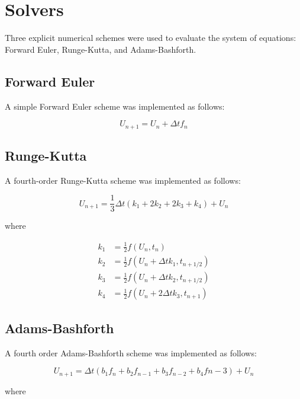 \documentclass[12pt, letterpaper]{article}
\begin{document}
\section{Solvers}

Three explicit numerical schemes were used to evaluate the system of equations: Forward Euler, Runge-Kutta, and Adams-Bashforth. 

\subsection{Forward Euler} 

A simple Forward Euler scheme was implemented as follows:

\begin{equation}
  U_{n + 1} = U_n + \Delta t f_n
\end{equation}

\subsection{Runge-Kutta}

A fourth-order Runge-Kutta scheme was implemented as follows: 

\begin{equation}
  U_{n+1} = \frac{1}{3} \Delta t \left( k_1 + 2 k_2 + 2 k_3 + k_4 \right) + U_n
\end{equation}

where 

\begin{align*}
  k_1 &= \frac{1}{2} f(U_n, t_n) \\
  k_2 &= \frac{1}{2} f(U_n + \Delta t k_1, t_{n + 1/2}) \\
  k_3 &= \frac{1}{2} f(U_n + \Delta t k_2, t_{n + 1/2}) \\
  k_4 &= \frac{1}{2} f(U_n + 2 \Delta t k_3, t_{n + 1})
\end{align*}

\subsection{Adams-Bashforth}

A fourth order Adams-Bashforth scheme was implemented as follows: 

\begin{equation}
U_{n + 1} = \Delta t \left(b_1 f_n + b_2 f_{n-1} + b_3 f_{n-2} + b_4 f{n-3} \right) + U_n
\end{equation}

where
\end{document}
